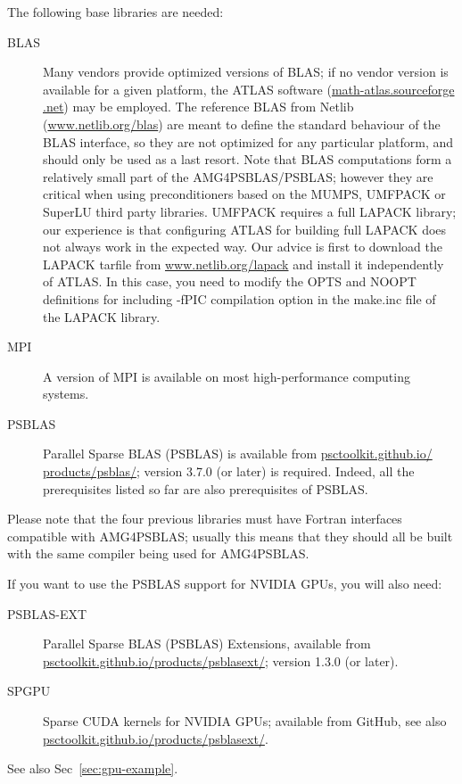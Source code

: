 The following base libraries are needed:
\begin{description}
\item[BLAS] \cite{blas3,blas2,blas1} Many vendors provide optimized versions
  of BLAS; if no vendor version is
  available for a given platform, the ATLAS software
  (\href{http://math-atlas.sourceforge.net}{math-atlas.sourceforge .net})
  may be employed.  The reference BLAS from Netlib
  (\href{http://www.netlib.org/blas}{www.netlib.org/blas}) are meant to define the standard
  behaviour of the BLAS interface, so they are not optimized for any
  particular platform, and should only be used as a last
  resort. Note that BLAS computations form a relatively small part of
  the AMG4PSBLAS/\-PSBLAS; however they are critical when using
  preconditioners based on the MUMPS, UMFPACK or SuperLU third party
  libraries. UMFPACK requires a full LAPACK library; our
experience is that configuring ATLAS for building full LAPACK does not always
work in the expected way. Our advice is first to download the LAPACK tarfile from
\href{http://www.netlib.org/lapack}{www.netlib.org/lapack} and install it independently of ATLAS. In this case,
you need to modify the OPTS and NOOPT definitions for including -fPIC compilation option
in the make.inc file of the LAPACK library.
 \item[MPI] \cite{MPI2,MPI1} A version of MPI is available on most
  high-performance computing systems.
 \item[PSBLAS] \cite{PSBLASGUIDE,psblas_00} Parallel Sparse BLAS (PSBLAS) is
  available from
  \href{https://psctoolkit.github.io/products/psblas/}{psctoolkit.github.io/
    products/psblas/}; version   3.7.0  (or later) is
  required. Indeed, all the prerequisites   listed so far are also
  prerequisites of PSBLAS. 
\end{description}
Please note that the four previous libraries must have Fortran
interfaces compatible with AMG4PSBLAS; usually this means that they
should all be built with the same compiler being used for  AMG4PSBLAS.

If you want to use the PSBLAS support for NVIDIA GPUs, you will also
need:
\begingroup
\sloppy
\begin{description}
 \item[PSBLAS-EXT] Parallel Sparse BLAS (PSBLAS) Extensions, 
  available from
  \href{https://psctoolkit.github.io/products/psblasext/}{psctoolkit.github.io/products/psblasext/}; version   1.3.0  (or later). 
 \item[SPGPU] Sparse CUDA kernels for NVIDIA GPUs; available from
   GitHub, see also
   \href{https://psctoolkit.github.io/products/psblasext/}{psctoolkit.github.io/products/psblasext/}.
 \end{description}
 See also Sec~\ref{sec:gpu-example}.
\endgroup

